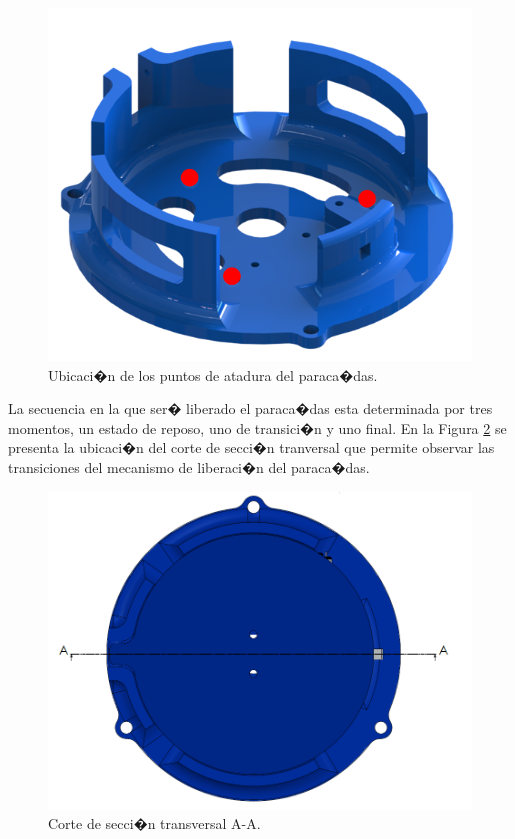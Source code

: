 \documentclass[10pt,a4paper]{book}
\begin{document}
\begin{figure}[H]
\begin{center}
\includegraphics[scale=0.45]{Imagenes/Paracaidasanclaje.png}
\caption{ Ubicaci�n de los puntos de atadura del paraca�das. \label{img:Paracaidasanclaje}}
\end{center}
\end{figure}   

La secuencia en la que ser� liberado el paraca�das esta determinada por tres momentos, un estado de reposo, uno de transici�n y uno final. En la Figura \ref{img:cortetransversal} se presenta la ubicaci�n del corte de secci�n tranversal que permite observar las transiciones del mecanismo de liberaci�n del paraca�das.

\begin{figure}[H]
\begin{center}
\includegraphics[scale=0.40]{Imagenes/Cortetransversal.png}
\caption{Corte de secci�n transversal A-A. \label{img:cortetransversal}}
\end{center}
\end{figure}
\end{document}
